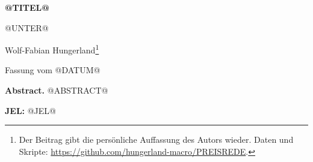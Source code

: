\documentclass[11pt,a4paper]{article}
\begin{document}
\begin{flushleft}
{\sffamily\bfseries\LARGE @TITEL@\par}
\vspace{0.4em}
{\sffamily\large @UNTER@\par}
\vspace{1em}
{\sffamily Wolf-Fabian Hungerland\footnote{Der Beitrag gibt die persönliche Auffassung des Autors wieder. Daten und Skripte: \url{https://github.com/hungerland-macro/PREISREDE}.}\par}
\vspace{0.3em}
{\sffamily\small Fassung vom @DATUM@\par}
\end{flushleft}
\vspace{0.8em}
\noindent\begin{minipage}{\linewidth}\small
\textsf{\textbf{Abstract.}} @ABSTRACT@\par\vspace{0.4em}
\textsf{\textbf{JEL:}} @JEL@
\end{minipage}
\vspace{0.6em}
\end{document}
